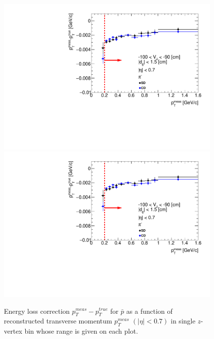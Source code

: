 \begin{figure}[H]
\caption[Energy loss correction for $\bar{p}$ as a function of reconstructed transverse momentum $p_T^{meas}$.]{Energy loss correction $p_T^{meas}-p_T^{true}$ for $\bar{p}$ as a function of reconstructed transverse momentum $p_T^{meas}$ $\left(|\eta|<0.7\right)$ in single $z$-vertex bin whose range is given on each plot.}\label{fig:energyLossPrimaryP_bar}
\parbox{0.329\textwidth}{
  \includegraphics[width=\linewidth,page=43]{graphics/energyLoss/energyLoss3D_OnePrtAlso.pdf}\\
  \includegraphics[width=\linewidth,page=46]{graphics/energyLoss/energyLoss3D_OnePrtAlso.pdf}\\
}
\end{figure}

